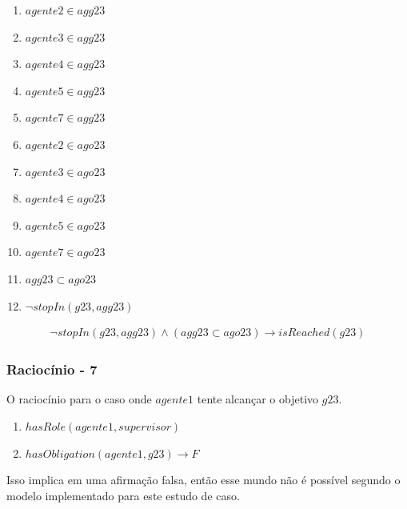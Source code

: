 \documentclass[12pt]{article}
\begin{document}
\begin{enumerate}
	\item $agente2 \in agg23$	
	\item $agente3 \in agg23$
	\item $agente4 \in agg23$
	\item $agente5 \in agg23$
	\item $agente7 \in agg23$								
	\item $agente2 \in ago23$	
	\item $agente3 \in ago23$
	\item $agente4 \in ago23$
	\item $agente5 \in ago23$
	\item $agente7 \in ago23$	
	\item $agg23 \subset ago23$
	\item $\neg stopIn(g23,agg23)$										
\end{enumerate}

\begin{eqnarray}\label{rel15}
	\neg stopIn(g23,agg23) \wedge (agg23 \subset ago23) \to isReached(g23)
\end{eqnarray}

\subsubsection{Raciocínio - 7}

O raciocínio para o caso onde $agente1$ tente alcançar o objetivo $g23$.  

\begin{enumerate}
	\item $hasRole(agente1,supervisor)$
	\item $hasObligation(agente1,g23) \to F$										
\end{enumerate}

Isso implica em uma afirmação falsa, então esse mundo não é possível segundo o modelo implementado para este estudo de caso.



\end{document}
